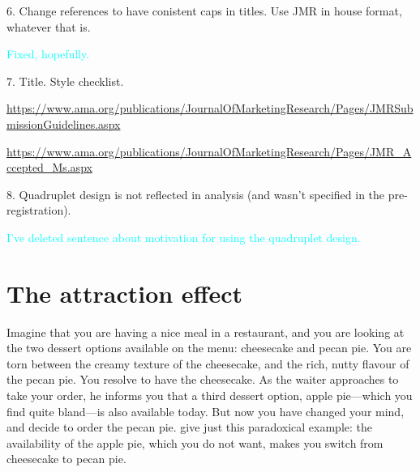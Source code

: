 \documentclass[12pt, a4paper]{article}
\newcommand{\AT}[1] {{\textcolor{cyan}{#1}}}
\begin{document}
6. Change references to have conistent caps in titles. Use JMR in house format, whatever that is.

\AT{Fixed, hopefully.}


7. Title. Style checklist.

\AT{\url{https://www.ama.org/publications/JournalOfMarketingResearch/Pages/JMRSubmissionGuidelines.aspx}}

\AT{\url{https://www.ama.org/publications/JournalOfMarketingResearch/Pages/JMR_Accepted_Ms.aspx}}

8. Quadruplet design is not reflected in analysis (and wasn't specified in the pre-registration).

\AT{I've deleted sentence about motivation for using the quadruplet design.}






\newpage

\section{The attraction effect}

Imagine that you are having a nice meal in a restaurant, and you are looking at the two dessert options available on the menu: cheesecake and pecan pie. You are torn between the creamy texture of the cheesecake, and the rich, nutty flavour of the pecan pie. You resolve to have the cheesecake. As the waiter approaches to take your order, he informs you that a third dessert option, apple pie---which you find quite bland---is also available today. But now you have changed your mind, and decide to order the pecan pie.  give just this paradoxical example: the availability of the apple pie, which you do not want, makes you switch from cheesecake to pecan pie.
\end{document}
